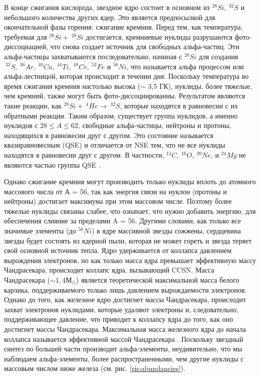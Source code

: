 \documentclass[14pt, a4paper]{article}
\numberwithin{figure}{section}
\numberwithin{equation}{section}
\begin{document}
В конце сжигания кислорода, звездное ядро состоит в основном из $^{28}Si, \ ^{32}S$ и небольшого количества других ядер. Это является предпосылкой для окончательной фазы горения: сжигание кремния. Перед тем, как температура, требуемая для $^{28}Si + \ ^{28}Si$ достигается, кремниевые нуклиды разрушаются фото-диссоциацией, что снова создает источник для свободных альфа-частиц. Эти альфа-частицы захватываются последовательно, начиная с $^{28}Si$ для создания $\ ^{32}S, \ ^{36}Ar, \ ^{40}Ca, \ ^{44}Ti, \ ^{48}Cr, \ ^{52}Fe$ и $^{56}Ni$, что называется альфа процессом или альфа-лестницой, которая происходит в течении дня. Поскольку температура во время сжигания кремния настолько высока ($\sim$ 3,5 ГК), нуклиды, более тяжелые, чем кремний, также могут быть фото-диссоциированны. Результатом являются такие реакции, как  $^{28}Si + \ ^4He \rightarrow \ ^{32}S$, которые находятся в равновесии с их обратными реакции. Таким образом, существует группа нуклидов, а именно нуклидов с $28 \le A \le 62$, свободные альфа-частицы, нейтроны и протоны, находящихся в равновесии друг с другом. Это состояние называется квазиравновесным (QSE) и отличается от NSE тем, что не все нуклиды находятся в равновесии друг с другом. В частности, $^{12}C, \ ^{16}O, \ ^{20}Ne$, и $^{24}Mg$ не являются частью группы QSE \cite{qse}.

Однако сжигание кремния могут производить только нуклиды вплоть до атомного массового числа от А = 56, так как энергия связи на нуклон (протоны и нейтроны) достигает максимума при этом массовом числе. Поэтому более тяжелые нуклиды связаны слабее, что означает, что нужно добавить энергию, для обеспечения слияние за пределами A = 56. Другими словами, как только все значимые элементы (до $^{56}Ni$) в ядре массивной звезды сожжены, сердцевина звезды будет состоять из ядерной пыли, которая не может гореть и звезда теряет свой основной источник тепла. Ядро удерживается от коллапса давлением вырождения электронов, но как только масса ядра превышает эффективную массу Чандрасекара, происходит коллапс ядра, вызывающий CCSN. Масса Чандрасекара ($\sim 1,4 М_\odot$) является теоретической максимальной масса белого карлика, поддерживаемого только лишь давлением вырождаемости электронов. Однако до того, как железное ядро достигнет массы Чандрасекара, происходит захват электронов нуклидами, которые удаляют электроны и, следовательно, поддерживающее давление, что приводит к коллапсу ядра до того, как оно достигнет массы Чандрасекара. Максимальная масса железного ядра до начала коллапса называется эффективной массой Чандрасекара \cite{massive}. Поскольку звездный синтез по большей части производит альфа-элементы, неудивительно, что мы наблюдаем альфа-элементы, более распространенными, чем другие нуклиды с массовым числом ниже железа (см. рис. \ref{ris:abundancies}).
\end{document}
